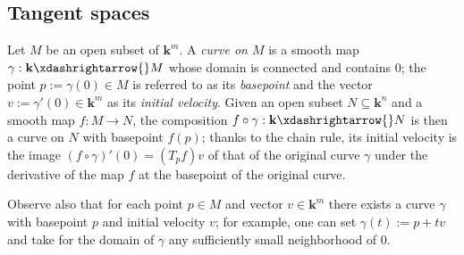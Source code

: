 \documentclass[reqno]{amsart} 
\begin{document}
\subsection{Tangent spaces\label{sec:diff-geom-tangent-spaces}}
\label{sec:orgd99d069}
Let $M$ be an open subset of $\mathbf{k}^m$.  A \emph{curve on $M$}
is a smooth map
$\gamma : \mathbf{k} \xdashrightarrow{} M$ whose domain is connected and contains $0$;
the point $p := \gamma(0) \in M$ is referred to as its
\emph{basepoint} and the vector
$v := \gamma'(0) \in \mathbf{k}^m$ as its \emph{initial
  velocity}.
Given an open subset $N \subseteq \mathbf{k} ^n$
and a smooth map $f : M \rightarrow N$, the composition
$f \circ \gamma : \mathbf{k} \xdashrightarrow{} N$ is then a curve on
$N$ with basepoint $f(p)$; thanks to the chain rule, its initial velocity
is the image $(f \circ \gamma)'(0) = (T_{p} f) v$ of that of the original curve $\gamma$
under the derivative of the map $f$ at the basepoint of the original curve.
\begin{remark}
\label{rmk:lots-of-curves}
  Observe also that for each point $p \in M$
  and vector $v \in \mathbf{k}^m$
  there exists a curve $\gamma$ with basepoint $p$ and initial
  velocity $v$;
  for example, one can set
  $\gamma(t) := p + t v$
  and take for the domain of $\gamma$ any sufficiently small neighborhood of $0$.
\end{remark}
\end{document}
